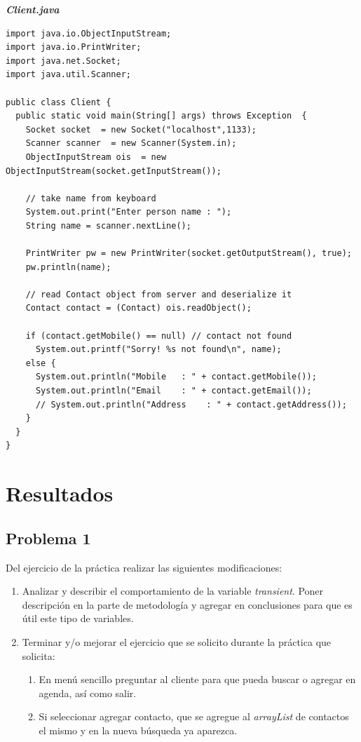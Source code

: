\documentclass[11pt, twocolumn]{article}
\begin{document}
  \textit{\textbf{Client.java}}
  \begin{lstlisting}
import java.io.ObjectInputStream;
import java.io.PrintWriter;
import java.net.Socket;
import java.util.Scanner;

public class Client {
  public static void main(String[] args) throws Exception  {
    Socket socket  = new Socket("localhost",1133);
    Scanner scanner  = new Scanner(System.in);
    ObjectInputStream ois  = new ObjectInputStream(socket.getInputStream());
    
    // take name from keyboard
    System.out.print("Enter person name : ");
    String name = scanner.nextLine();

    PrintWriter pw = new PrintWriter(socket.getOutputStream(), true);
    pw.println(name);

    // read Contact object from server and deserialize it
    Contact contact = (Contact) ois.readObject();

    if (contact.getMobile() == null) // contact not found
      System.out.printf("Sorry! %s not found\n", name);
    else {
      System.out.println("Mobile   : " + contact.getMobile());
      System.out.println("Email    : " + contact.getEmail());
      // System.out.println("Address    : " + contact.getAddress());
    }
  }
}
  \end{lstlisting}

  \section*{Resultados}
  \subsection*{Problema 1}
  Del ejercicio de la práctica realizar las siguientes modificaciones:

  \begin{enumerate}[label=\alph*.]
    \item Analizar y describir el comportamiento de la variable \textit{transient}. Poner descripción en la parte de metodología y agregar en conclusiones para que es útil este tipo de variables.
    \item Terminar y/o mejorar el ejercicio que se solicito durante la práctica que solicita:
    
    \begin{enumerate}[label=\roman*.]
      \item En menú sencillo preguntar al cliente para que pueda buscar o agregar en agenda, así como salir.
      \item Si seleccionar agregar contacto, que se agregue al \textit{arrayList} de contactos el mismo y en la nueva búsqueda ya aparezca.
    \end{enumerate}
  \end{enumerate}
\end{document}
